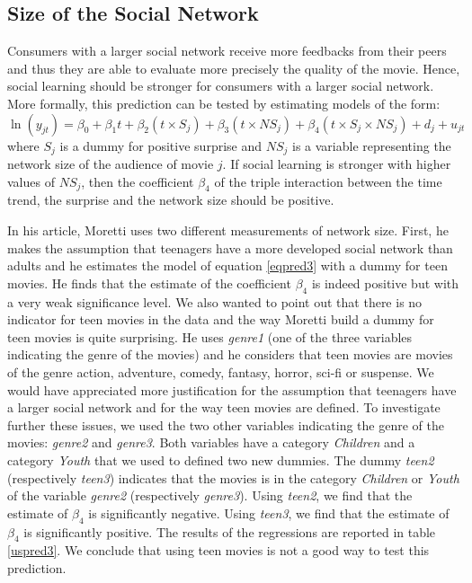 \subsection{Size of the Social Network}\label{subsec2.4}

Consumers with a larger social network receive more feedbacks from their peers and thus they are able to evaluate more precisely the quality of the movie.
Hence, social learning should be stronger for consumers with a larger social network.
More formally, this prediction can be tested by estimating models of the form:
\begin{equation}
	\ln (y_{jt})  = \beta_0 + \beta_1 t + \beta_2 (t \times S_j) + \beta_3 (t \times NS_j) + \beta_4 (t \times S_j \times NS_j) + d_j + u_{jt}
	\label{eqpred3}
\end{equation}
where $S_j$ is a dummy for positive surprise and $NS_j$ is a variable representing the network size of the audience of movie $j$.
If social learning is stronger with higher values of $NS_j$, then the coefficient $\beta_4$ of the triple interaction between the time trend, the surprise and the network size should be positive.

In his article, Moretti uses two different measurements of network size.
First, he makes the assumption that teenagers have a more developed social network than adults and he estimates the model of equation \ref{eqpred3} with a dummy for teen movies.
He finds that the estimate of the coefficient $\beta_4$ is indeed positive but with a very weak significance level.
We also wanted to point out that there is no indicator for teen movies in the data and the way Moretti build a dummy for teen movies is quite surprising.
He uses \textit{genre1} (one of the three variables indicating the genre of the movies) and he considers that teen movies are movies of the genre action, adventure, comedy, fantasy, horror, sci-fi or suspense.
We would have appreciated more justification for the assumption that teenagers have a larger social network and for the way teen movies are defined.
To investigate further these issues, we used the two other variables indicating the genre of the movies: \textit{genre2} and \textit{genre3}.
Both variables have a category \textit{Children} and a category \textit{Youth} that we used to defined two new dummies.
The dummy \textit{teen2} (respectively \textit{teen3}) indicates that the movies is in the category \textit{Children} or \textit{Youth} of the variable \textit{genre2} (respectively \textit{genre3}).
Using \textit{teen2}, we find that the estimate of $\beta_4$ is significantly negative.
Using \textit{teen3}, we find that the estimate of $\beta_4$ is significantly positive.
The results of the regressions are reported in table \ref{uspred3}.
We conclude that using teen movies is not a good way to test this prediction.

